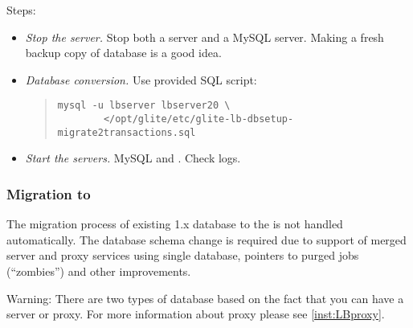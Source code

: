 Steps:
\begin{itemize}
 \item \emph{Stop the server.} Stop both a \LB server and a MySQL
 server. Making a fresh backup copy of database is a good idea.
 \item \emph{Database conversion.} Use provided SQL script:
  \begin{quote}
   \begin{verbatim}
mysql -u lbserver lbserver20 \
        </opt/glite/etc/glite-lb-dbsetup-migrate2transactions.sql
   \end{verbatim}
  \end{quote}
 \item \emph{Start the servers.} MySQL and \LB. Check logs.
\end{itemize}


\subsubsection{Migration to }
The migration process of existing \LB 1.x database to the  is
not handled automatically. The database schema change is required due
to support of merged \LB server and proxy services using single
database, pointers to purged jobs (``zombies'') and other
improvements.

Warning: There are two types of \LB database based on the fact that
you can have a \LB server or \LB proxy. For more information about \LB
proxy please see \ref{inst:LBproxy}.

